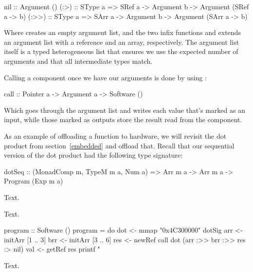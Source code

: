 \documentclass[../main.tex]{subfiles}
\begin{document}
\begin{code}
nil   :: Argument ()
(:>)  :: SType a => SRef a -> Argument b -> Argument (SRef a -> b)
(:>>) :: SType a => SArr a -> Argument b -> Argument (SArr a -> b)
\end{code}

\noindent Where  creates an empty argument list, and the two infix functions \codei{(:>)} and \codei{(:>>)} extends an argument list with a reference and an array, respectively. The argument list itself is a typed heterogeneous list that ensures we use the expected number of arguments and that all intermediate types match.

Calling a component once we have our arguments is done by using :

\begin{code}
call :: Pointer a -> Argument a -> Software ()
\end{code}

\noindent Which goes through the argument list and writes each value that's marked as an input, while those marked as outputs store the result read from the component.

As an example of offloading a function to hardware, we will revisit the dot product from section~\ref{embedded} and offload that. Recall that our sequential version of the dot product had the following type signature:

\begin{code}
dotSeq :: (MonadComp m, TypeM m a, Num a) => Arr m a -> Arr m a
  -> Program (Exp m a)
\end{code}

Text.


Text.

\begin{code}
program :: Software ()
program = do
  dot <- mmap "0x4C300000" dotSig
  arr <- initArr [1 .. 3]
  brr <- initArr [3 .. 6]
  res <- newRef
  call dot (arr :>> brr :>> res :> nil)
  val <- getRef res
  printf "%
\end{code}

Text.
\end{document}
